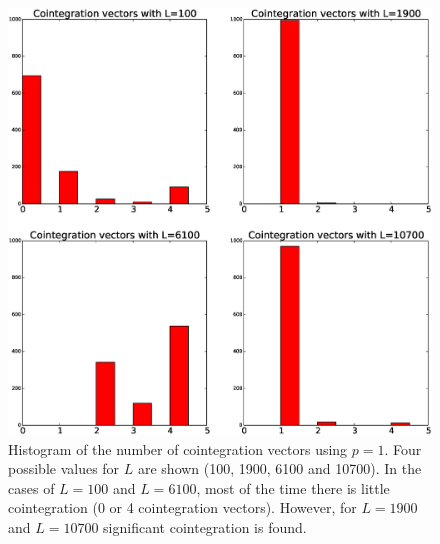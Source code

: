 \begin{figure}[!h]
  \centering
  \includegraphics[width=\textwidth]{img/histCointVectors}
  \caption{Histogram of the number of cointegration vectors using $p=1$. Four
  possible values for $L$ are shown (100, 1900, 6100 and 10700).
  In the cases of $L=100$ and $L=6100$, most of the time there is little
  cointegration (0 or 4 cointegration vectors). However, for $L=1900$ and
  $L=10700$ significant cointegration is found.}
  \label{fig:hists}
\end{figure}


